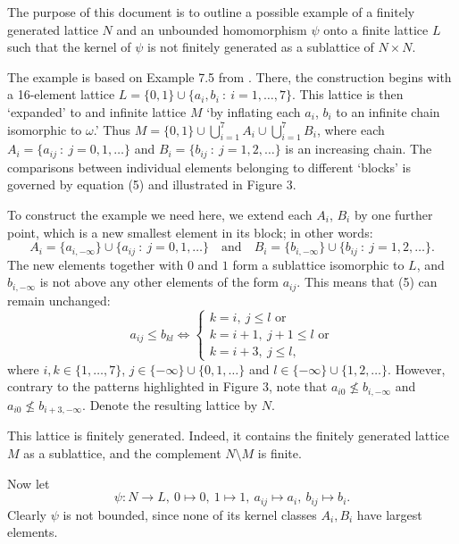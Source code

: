 \documentclass[12pt]{amsart}
\date{}
\newcommand{\setsuchthat}{\: : \: }%
\begin{document}
The purpose of this document is to outline a possible example of a finitely generated lattice
$N$ and an unbounded homomorphism $\psi$ onto a finite lattice $L$ such that the kernel of $\psi$ is not finitely generated as a sublattice of $N\times N$.

The example is based on Example 7.5 from \cite{mr-subd}.
There, the construction begins with a 16-element lattice $L=\{0,1\}\cup\{a_i,b_i\::\: i=1,\dots,7\}$.
This lattice is then `expanded' to and infinite lattice $M$ `by inflating each $a_i$, $b_i$ to an infinite chain isomorphic to $\omega$.'
Thus
$
M= \{0,1\}\cup \bigcup_{i=1}^7 A_i\cup \bigcup_{i=1}^7 B_i
$,
where each
$A_i=\{a_{ij}\setsuchthat j=0,1,\dots\}$ and $ B_i=\{b_{ij}\setsuchthat j=1,2,\dots\}$
is an increasing chain.
The comparisons between individual elements belonging to different `blocks' is governed by equation (5)
and illustrated in Figure 3.

To construct the example we need here, we extend each $A_i$, $B_i$ by one further point, which is a new
smallest element in its block; in other words:
\[
A_i=\{ a_{i,-\infty}\} \cup \{a_{ij}\setsuchthat j=0,1,\dots\}\quad\text{and}\quad
 B_i=\{ b_{i,-\infty}\} \cup \{b_{ij}\setsuchthat j=1,2,\dots\}.
\]
The new elements together with $0$ and $1$ form a sublattice isomorphic to $L$, and $b_{i,-\infty}$ is not above any other elements of the form $a_{ij}$. This means that (5) can remain unchanged:
\begin{equation*}
\label{eq4}
a_{ij}\leq b_{kl}\Leftrightarrow
\begin{cases}
k=i,\ j\leq l \text{ or}\\
k=i+1,\ j+1\leq l \text{ or}\\
k=i+3,\ j\leq l,
\end{cases}
\end{equation*}
where $i,k\in\{1,\dots,7\}$, $j\in\{-\infty\}\cup\{0,1,\dots\}$ and $l\in\{-\infty\}\cup\{ 1,2,\dots\}$.
However, contrary to the patterns highlighted in Figure 3, note that
$a_{i0}\nleq b_{i,-\infty}$ and $a_{i0}\nleq b_{i+3,-\infty}$.
Denote the resulting lattice by $N$.

This lattice is finitely generated. Indeed, it contains the finitely generated lattice $M$ as a sublattice, and the complement $N\setminus M$ is finite.

Now let
\[
\psi : N\rightarrow L,\ 0\mapsto 0,\ 1\mapsto 1,\ a_{ij}\mapsto a_i,\ b_{ij}\mapsto b_i.
\]
Clearly $\psi$ is not bounded, since none of its kernel classes $A_i,B_i$ have largest elements.
\end{document}
